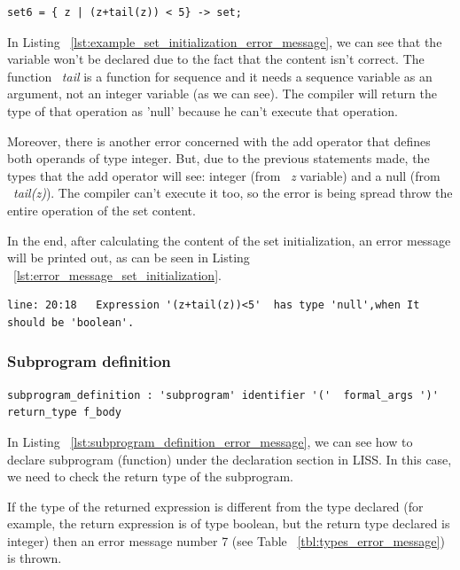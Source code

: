 \documentclass[
  oneside,
  11pt, a4paper,
  footinclude=true,
  headinclude=true,
  cleardoublepage=empty
]{scrbook}
\begin{document}
\begin{lstlisting}[label={lst:example_set_initialization_error_message},caption={Example of an error in LISS for set\_initialization}]
  set6 = { z | (z+tail(z)) < 5} -> set;
\end{lstlisting}

In Listing ~\ref{lst:example_set_initialization_error_message}, we can see that the variable won't be declared due to the fact that the content isn't correct. The function ~\textit{tail} is a function for sequence and it needs a sequence variable as an argument, not an integer variable (as we can see). The compiler will return the type of that operation as 'null' because he can't execute that operation.

Moreover, there is another error concerned with the add operator that defines both operands of type integer. But, due to the previous statements made, the types that the add operator will see: integer (from ~\textit{z} variable) and a null (from ~\textit{tail(z)}). 
The compiler can't execute it too, so the error is being spread throw the entire operation of the set content.

In the end, after calculating the content of the set initialization, an error message will be printed out, as can be seen in Listing ~\ref{lst:error_message_set_initialization}.

\begin{lstlisting}[label={lst:error_message_set_initialization},caption={Error message for the set\_initialization}]
  line: 20:18	Expression '(z+tail(z))<5'  has type 'null',when It should be 'boolean'.
\end{lstlisting}

\subsubsection{Subprogram definition}

\begin{lstlisting}[label={lst:subprogram_definition_error_message},caption={Subprogram definition rule in LISS}]
  subprogram_definition : 'subprogram' identifier '('  formal_args ')' return_type f_body
\end{lstlisting}

In Listing ~\ref{lst:subprogram_definition_error_message}, we can see how to declare subprogram (function) under the declaration section in LISS.
In this case, we need to check the return type of the subprogram.

If the type of the returned expression is different from the type declared (for example, the return expression is of type boolean, but the return type declared is integer) then an error message number 7 (see Table ~\ref{tbl:types_error_message}) is thrown.
\end{document}
